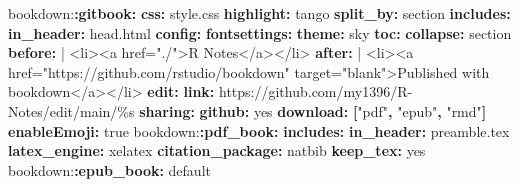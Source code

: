 \documentclass[
]{book}
\newenvironment{Shaded}{\begin{snugshade}}{\end{snugshade}}
\newcommand{\AttributeTok}[1]{\textcolor[rgb]{0.13,0.29,0.53}{#1}}
\newcommand{\CharTok}[1]{\textcolor[rgb]{0.31,0.60,0.02}{#1}}
\newcommand{\FunctionTok}[1]{\textcolor[rgb]{0.13,0.29,0.53}{\textbf{#1}}}
\newcommand{\KeywordTok}[1]{\textcolor[rgb]{0.13,0.29,0.53}{\textbf{#1}}}
\newcommand{\NormalTok}[1]{#1}
\newcommand{\StringTok}[1]{\textcolor[rgb]{0.31,0.60,0.02}{#1}}
\theoremstyle{definition}
\theoremstyle{definition}
\theoremstyle{definition}
\theoremstyle{definition}
\theoremstyle{remark}
\begin{document}
\begin{Shaded}
\begin{Highlighting}[]
\AttributeTok{bookdown:}\FunctionTok{:gitbook}\KeywordTok{:}
\AttributeTok{  }\FunctionTok{css}\KeywordTok{:}\AttributeTok{ style.css}
\AttributeTok{  }\FunctionTok{highlight}\KeywordTok{:}\AttributeTok{ tango}
\AttributeTok{  }\FunctionTok{split\_by}\KeywordTok{:}\AttributeTok{ section}
\AttributeTok{  }\FunctionTok{includes}\KeywordTok{:}
\AttributeTok{    }\FunctionTok{in\_header}\KeywordTok{:}\AttributeTok{ head.html}
\AttributeTok{  }\FunctionTok{config}\KeywordTok{:}
\AttributeTok{    }\FunctionTok{fontsettings}\KeywordTok{:}
\AttributeTok{      }\FunctionTok{theme}\KeywordTok{:}\AttributeTok{ sky}
\AttributeTok{    }\FunctionTok{toc}\KeywordTok{:}
\AttributeTok{      }\FunctionTok{collapse}\KeywordTok{:}\AttributeTok{ section}
\FunctionTok{      before}\KeywordTok{: }\CharTok{|}
\NormalTok{        \textless{}li\textgreater{}\textless{}a href="./"\textgreater{}R Notes\textless{}/a\textgreater{}\textless{}/li\textgreater{}}
\FunctionTok{      after}\KeywordTok{: }\CharTok{|}
\NormalTok{        \textless{}li\textgreater{}\textless{}a href="https://github.com/rstudio/bookdown" target="blank"\textgreater{}Published with bookdown\textless{}/a\textgreater{}\textless{}/li\textgreater{}}
\AttributeTok{    }\FunctionTok{edit}\KeywordTok{:}\AttributeTok{ }
\AttributeTok{        }\FunctionTok{link}\KeywordTok{:}\AttributeTok{ https://github.com/my1396/R{-}Notes/edit/main/\%s}
\AttributeTok{    }\FunctionTok{sharing}\KeywordTok{:}
\AttributeTok{        }\FunctionTok{github}\KeywordTok{:}\AttributeTok{ }\CharTok{yes}
\AttributeTok{    }\FunctionTok{download}\KeywordTok{:}\AttributeTok{ }\KeywordTok{[}\StringTok{"pdf"}\KeywordTok{,}\AttributeTok{ }\StringTok{"epub"}\KeywordTok{,}\AttributeTok{ }\StringTok{"rmd"}\KeywordTok{]}
\AttributeTok{    }\FunctionTok{enableEmoji}\KeywordTok{:}\AttributeTok{ }\CharTok{true}
\AttributeTok{bookdown:}\FunctionTok{:pdf\_book}\KeywordTok{:}
\AttributeTok{  }\FunctionTok{includes}\KeywordTok{:}
\AttributeTok{    }\FunctionTok{in\_header}\KeywordTok{:}\AttributeTok{ preamble.tex}
\AttributeTok{  }\FunctionTok{latex\_engine}\KeywordTok{:}\AttributeTok{ xelatex}
\AttributeTok{  }\FunctionTok{citation\_package}\KeywordTok{:}\AttributeTok{ natbib}
\AttributeTok{  }\FunctionTok{keep\_tex}\KeywordTok{:}\AttributeTok{ }\CharTok{yes}
\AttributeTok{bookdown:}\FunctionTok{:epub\_book}\KeywordTok{:}\AttributeTok{ default}
\end{Highlighting}
\end{Shaded}
\end{document}
